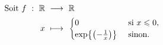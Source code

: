 \cite{contre-exemples}
\begin{alignat*}{2}
    \text{Soit } f\ :\ \R\ &\longrightarrow\ \R\\
    x\ &\longmapsto\ 
    \begin{cases}
        0 &\text{ si } x \leqslant 0,\\
        \exp{\left(-\frac{1}{x}\right)} &\text{ sinon}.
    \end{cases}
\end{alignat*}
        